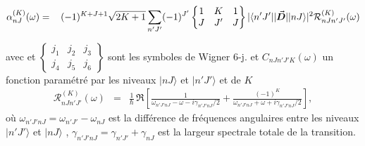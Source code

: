 \begin{eqnarray*}
	\alpha^{(K)}_{nJ}(\omega) &=& \, (-1)^{K + J + 1} \sqrt{2K + 1} \sum_{n'J'} (-1)^{J'} 
\begin{Bmatrix}
1 & K & 1 \\
J & J' & J
\end{Bmatrix}
|\langle n'J' || \vec{{\bm{D}}} || nJ \rangle|^2  \mathcal{R}_{nJn'J'}^{(K)}(\omega)\nonumber \\
\end{eqnarray*}

avec et $\begin{Bmatrix} j_1 & j_2 & j_3 \\ j_4 & j_5 & j_6 \end{Bmatrix}$ sont les symboles de Wigner 6-j. et $C_{nJn'J'K}(\omega)$ un fonction paramétré par les niveaux $\vert n J \rangle$ et $\vert n' J' \rangle$ et de $K$ 
\begin{eqnarray*}
	\mathcal{R}_{nJn'J'}^{(K)}(\omega) & = &	 \frac{1}{\hbar} \, \Re \left[ \frac{1}{\omega_{n'J'nJ} - \omega - i\gamma_{n'J'nJ}/2} + \frac{(-1)^K}{\omega_{n'J'nJ} + \omega + i\gamma_{n'J'nJ}/2} \right],
\end{eqnarray*}
où $\omega_{n'J'nJ} = \omega_{n'J'} - \omega_{nJ}$ est la différence de fréquences angulaires entre les niveaux $|n'J'\rangle$ et $|nJ\rangle$ , $\gamma_{n'J'nJ} = \gamma_{n'J'} + \gamma_{nJ}$ est la largeur spectrale totale de la transition.






